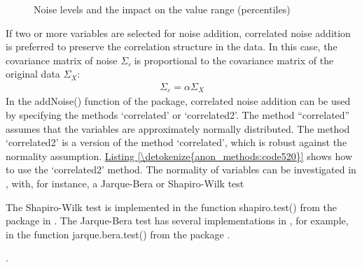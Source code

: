 \documentclass[letterpaper,10pt,english]{sphinxmanual}
\begin{document}
\begin{figure}[htbp]
\centering
\capstart

\noindent{}
\caption{Noise levels and the impact on the value range (percentiles)}\label{\detokenize{anon_methods:fig58}}\label{\detokenize{anon_methods:id43}}\end{figure}

If two or more variables are selected for noise addition, correlated
noise addition is preferred to preserve the correlation structure in the
data. In this case, the covariance matrix of noise
\(\Sigma_{\varepsilon}\ \)is proportional to the covariance matrix
of the original data \(\Sigma_{X}:\)
\begin{equation*}
\begin{split}\Sigma_{\varepsilon} = \alpha \Sigma_{X}\end{split}
\end{equation*}
In the addNoise() function of the  package, correlated noise
addition can be used by specifying the methods ‘correlated’ or
‘correlated2’. The method “correlated” assumes that the variables are
approximately normally distributed. The method ‘correlated2’ is a
version of the method ‘correlated’, which is robust against the
normality assumption. \hyperref[\detokenize{anon_methods:code520}]{Listing \ref{\detokenize{anon_methods:code520}}} shows how to use the ‘correlated2’
method. The normality of variables can be investigated in , with, for
instance, a Jarque-Bera or Shapiro-Wilk test %
\begin{footnote}[20]\sphinxAtStartFootnote
The Shapiro-Wilk test is implemented in the function shapiro.test()
from the package  in . The Jarque-Bera test has several
implementations in , for example, in the function
jarque.bera.test() from the package .
%
\end{footnote}.
\end{document}
